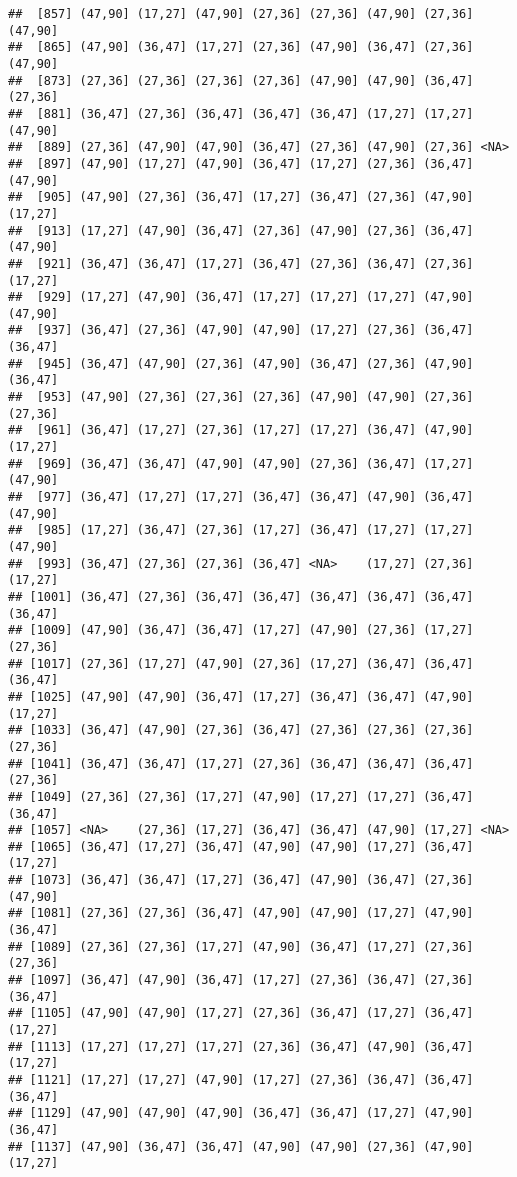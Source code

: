 \documentclass[12pt,]{article}
\begin{document}
\begin{verbatim}
##  [857] (47,90] (17,27] (47,90] (27,36] (27,36] (47,90] (27,36] (47,90]
##  [865] (47,90] (36,47] (17,27] (27,36] (47,90] (36,47] (27,36] (47,90]
##  [873] (27,36] (27,36] (27,36] (27,36] (47,90] (47,90] (36,47] (27,36]
##  [881] (36,47] (27,36] (36,47] (36,47] (36,47] (17,27] (17,27] (47,90]
##  [889] (27,36] (47,90] (47,90] (36,47] (27,36] (47,90] (27,36] <NA>   
##  [897] (47,90] (17,27] (47,90] (36,47] (17,27] (27,36] (36,47] (47,90]
##  [905] (47,90] (27,36] (36,47] (17,27] (36,47] (27,36] (47,90] (17,27]
##  [913] (17,27] (47,90] (36,47] (27,36] (47,90] (27,36] (36,47] (47,90]
##  [921] (36,47] (36,47] (17,27] (36,47] (27,36] (36,47] (27,36] (17,27]
##  [929] (17,27] (47,90] (36,47] (17,27] (17,27] (17,27] (47,90] (47,90]
##  [937] (36,47] (27,36] (47,90] (47,90] (17,27] (27,36] (36,47] (36,47]
##  [945] (36,47] (47,90] (27,36] (47,90] (36,47] (27,36] (47,90] (36,47]
##  [953] (47,90] (27,36] (27,36] (27,36] (47,90] (47,90] (27,36] (27,36]
##  [961] (36,47] (17,27] (27,36] (17,27] (17,27] (36,47] (47,90] (17,27]
##  [969] (36,47] (36,47] (47,90] (47,90] (27,36] (36,47] (17,27] (47,90]
##  [977] (36,47] (17,27] (17,27] (36,47] (36,47] (47,90] (36,47] (47,90]
##  [985] (17,27] (36,47] (27,36] (17,27] (36,47] (17,27] (17,27] (47,90]
##  [993] (36,47] (27,36] (27,36] (36,47] <NA>    (17,27] (27,36] (17,27]
## [1001] (36,47] (27,36] (36,47] (36,47] (36,47] (36,47] (36,47] (36,47]
## [1009] (47,90] (36,47] (36,47] (17,27] (47,90] (27,36] (17,27] (27,36]
## [1017] (27,36] (17,27] (47,90] (27,36] (17,27] (36,47] (36,47] (36,47]
## [1025] (47,90] (47,90] (36,47] (17,27] (36,47] (36,47] (47,90] (17,27]
## [1033] (36,47] (47,90] (27,36] (36,47] (27,36] (27,36] (27,36] (27,36]
## [1041] (36,47] (36,47] (17,27] (27,36] (36,47] (36,47] (36,47] (27,36]
## [1049] (27,36] (27,36] (17,27] (47,90] (17,27] (17,27] (36,47] (36,47]
## [1057] <NA>    (27,36] (17,27] (36,47] (36,47] (47,90] (17,27] <NA>   
## [1065] (36,47] (17,27] (36,47] (47,90] (47,90] (17,27] (36,47] (17,27]
## [1073] (36,47] (36,47] (17,27] (36,47] (47,90] (36,47] (27,36] (47,90]
## [1081] (27,36] (27,36] (36,47] (47,90] (47,90] (17,27] (47,90] (36,47]
## [1089] (27,36] (27,36] (17,27] (47,90] (36,47] (17,27] (27,36] (27,36]
## [1097] (36,47] (47,90] (36,47] (17,27] (27,36] (36,47] (27,36] (36,47]
## [1105] (47,90] (47,90] (17,27] (27,36] (36,47] (17,27] (36,47] (17,27]
## [1113] (17,27] (17,27] (17,27] (27,36] (36,47] (47,90] (36,47] (17,27]
## [1121] (17,27] (17,27] (47,90] (17,27] (27,36] (36,47] (36,47] (36,47]
## [1129] (47,90] (47,90] (47,90] (36,47] (36,47] (17,27] (47,90] (36,47]
## [1137] (47,90] (36,47] (36,47] (47,90] (47,90] (27,36] (47,90] (17,27]

\end{verbatim}
\end{document}
